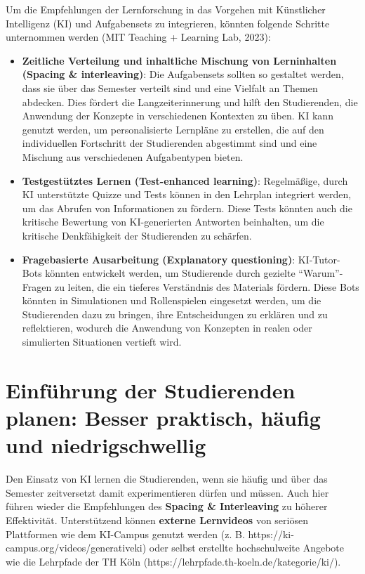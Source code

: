 \documentclass[
  ngerman,
  letterpaper,
  DIV=11]{scrreprt}
\providecommand{\tightlist}{%
  \setlength{\itemsep}{0pt}\setlength{\parskip}{0pt}}
\begin{document}
Um die Empfehlungen der Lernforschung in das Vorgehen mit Künstlicher
Intelligenz (KI) und Aufgabensets zu integrieren, könnten folgende
Schritte unternommen werden (MIT Teaching + Learning Lab, 2023):

\begin{itemize}
\tightlist
\item
  \textbf{Zeitliche Verteilung und inhaltliche Mischung von Lerninhalten
  (Spacing \& interleaving)}: Die Aufgabensets sollten so gestaltet
  werden, dass sie über das Semester verteilt sind und eine Vielfalt an
  Themen abdecken. Dies fördert die Langzeiterinnerung und hilft den
  Studierenden, die Anwendung der Konzepte in verschiedenen Kontexten zu
  üben. KI kann genutzt werden, um personalisierte Lernpläne zu
  erstellen, die auf den individuellen Fortschritt der Studierenden
  abgestimmt sind und eine Mischung aus verschiedenen Aufgabentypen
  bieten.
\item
  \textbf{Testgestütztes Lernen (Test-enhanced learning)}: Regelmäßige,
  durch KI unterstützte Quizze und Tests können in den Lehrplan
  integriert werden, um das Abrufen von Informationen zu fördern. Diese
  Tests könnten auch die kritische Bewertung von KI-generierten
  Antworten beinhalten, um die kritische Denkfähigkeit der Studierenden
  zu schärfen.
\item
  \textbf{Fragebasierte Ausarbeitung (Explanatory questioning)}:
  KI-Tutor-Bots könnten entwickelt werden, um Studierende durch gezielte
  ``Warum''-Fragen zu leiten, die ein tieferes Verständnis des Materials
  fördern. Diese Bots könnten in Simulationen und Rollenspielen
  eingesetzt werden, um die Studierenden dazu zu bringen, ihre
  Entscheidungen zu erklären und zu reflektieren, wodurch die Anwendung
  von Konzepten in realen oder simulierten Situationen vertieft wird.
\end{itemize}

\section{Einführung der Studierenden planen: Besser praktisch, häufig
und
niedrigschwellig}\label{einfuxfchrung-der-studierenden-planen-besser-praktisch-huxe4ufig-und-niedrigschwellig}

Den Einsatz von KI lernen die Studierenden, wenn sie häufig und über das
Semester zeitversetzt damit experimentieren dürfen und müssen. Auch hier
führen wieder die Empfehlungen des \textbf{Spacing \& Interleaving} zu
höherer Effektivität. Unterstützend können \textbf{externe Lernvideos}
von seriösen Plattformen wie dem KI-Campus genutzt werden (z. B.
https://ki-campus.org/videos/generativeki) oder selbst erstellte
hochschulweite Angebote wie die Lehrpfade der TH Köln
(https://lehrpfade.th-koeln.de/kategorie/ki/).
\end{document}
